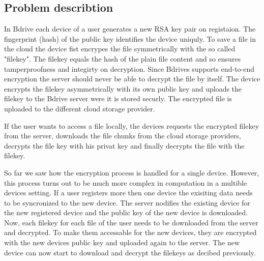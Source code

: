 


\subsection{Problem describtion}

In Bdrive each device of a user generates a new \ac{RSA} key pair on registaion. The fingerprint (hash) of the public key identifies the device uniquly. To save a file in the cloud the device fist encrypes the file symmetrically with the so called "filekey". The filekey equals the hash of the plain file content and so ensures tamperproofness and integirty on decryption. Since Bdrives supports end-to-end encryption the server should never be able to decrypt the file by itself. The device encrypts the filekey asymmetrically with its own public key and uploads the filekey to the Bdrive server were it is stored securly. The encrypted file is uploaded to the different cloud storage provider. 

If the user wants to access a file locally, the devices requests the encrypted filekey from the server, downloads the file chunks from the cloud storage providers, decrypts the file key with his privat key and finally decrypts the file with the filekey. 

So far we saw how the encryption process is handled for a single device. However, this process turns out to be much more complex in computation in a multible devices setting.  If a user registers more then one device the exisiting data needs to be syncronized to the new device. The server nodifies the existing device for the new registered device and the public key of the new device is downloaded. Now, each filekey for each file of the user needs to be downloaded from the server and decrypted. To make them accessable for the new devices, they are encrypted with the new devices public key and uploaded again to the server. The new device can now start to download and decrypt the filekeys as decibed previously. 

